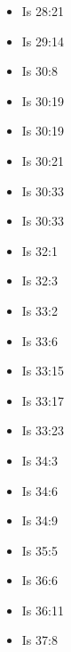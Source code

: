 \documentclass[14pt]{article}
\begin{document}
\begin{multicols}{2}
\begin{itemize}
		\item Is 28:21
		
		\item Is 29:14
		
		\item Is 30:8
		
		\item Is 30:19
		
		\item Is 30:19
		
		\item Is 30:21
		
		\item Is 30:33
		
		\item Is 30:33
		
		\item Is 32:1
		
		\item Is 32:3
		
		\item Is 33:2
		
		\item Is 33:6
		
		\item Is 33:15
		
		\item Is 33:17
		
		\item Is 33:23
		
		\item Is 34:3
		
		\item Is 34:6
		
		\item Is 34:9
		
		\item Is 35:5
		
		\item Is 36:6
		
		\item Is 36:11
		
		\item Is 37:8
		

\end{itemize}
\end{multicols}
\end{document}
